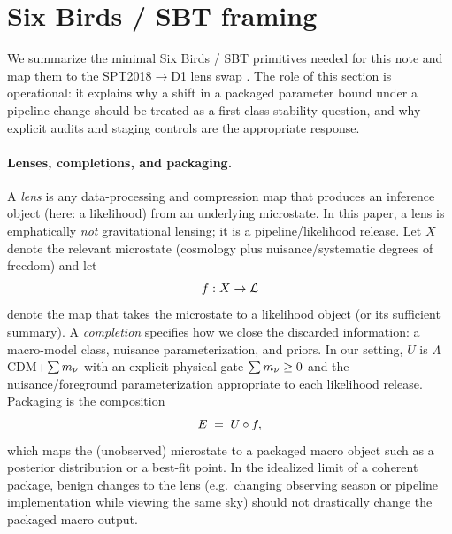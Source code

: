 \section{Six Birds / SBT framing}
\label{sec:sbt-framework}

We summarize the minimal Six Birds / SBT primitives needed for this note and map them to the SPT2018$\rightarrow$D1 lens swap \cite{sixbirds_foundations,sixbirds_darkenergy}. The role of this section is operational: it explains why a shift in a packaged parameter bound under a pipeline change should be treated as a first-class stability question, and why explicit audits and staging controls are the appropriate response.

\paragraph{Lenses, completions, and packaging.}
A \emph{lens} is any data-processing and compression map that produces an inference object (here: a likelihood) from an underlying microstate. In this paper, a lens is emphatically \emph{not} gravitational lensing; it is a pipeline/likelihood release. Let $X$ denote the relevant microstate (cosmology plus nuisance/systematic degrees of freedom) and let
\begin{equation}
  f : X \to \mathcal{L}
  \label{eq:lens_map}
\end{equation}
denote the map that takes the microstate to a likelihood object (or its sufficient summary). A \emph{completion} specifies how we close the discarded information: a macro-model class, nuisance parameterization, and priors. In our setting, $U$ is $\Lambda$CDM+$\sum m_\nu$ with an explicit physical gate $\sum m_\nu\ge 0$ and the nuisance/foreground parameterization appropriate to each likelihood release. Packaging is the composition
\begin{equation}
  E \;=\; U \circ f,
  \label{eq:packaging_def}
\end{equation}
which maps the (unobserved) microstate to a packaged macro object such as a posterior distribution or a best-fit point. In the idealized limit of a coherent package, benign changes to the lens (e.g.\ changing observing season or pipeline implementation while viewing the same sky) should not drastically change the packaged macro output.

